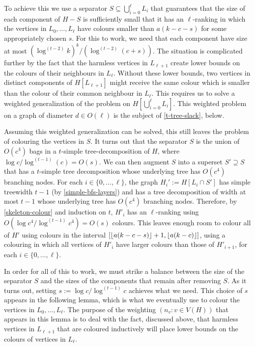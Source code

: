 \documentclass[kpfonts]{patmorin}
\theoremstyle{named}
\begin{document}
To achieve this we use a separator $S\subseteq \bigcup_{i=0}^\ell L_i$ that guarantees that the size of each component of $H-S$ is sufficiently small that it has an $\ell$-ranking in which the vertices in $L_0,\ldots,L_\ell$ have colours smaller than $a(k-c-s)$ for some appropriately chosen $s$. For this to work, we need that each component have size at most $(\log^{(t-2)} k)^k/(\log^{(t-2)}(c+s))$.  The situation is complicated further by the fact that the harmless vertices in $L_{\ell+1}$ create lower bounds on the colours of their neighbours in $L_\ell$.  Without these lower bounds, two vertices in distinct components of $H[L_{\ell+1}]$ might receive the same colour which is smaller than the colour of their common neighbour in $L_\ell$.  This requires us to solve a weighted generalization of the problem on $H[\bigcup_{i=0}^{\ell} L_i]$.  This weighted problem on a graph of diameter $d\in O(\ell)$ is the subject of \cref{t-tree-slack}, below.

Assuming this weighted generalization can be solved, this still leaves the problem of colouring the vertices in $S$.  It turns out that the separator $S$ is the union of $O(c^4)$ bags in a $t$-simple tree-decomposition of $H$, where $\log c/\log^{(t-1)}(c)=O(s)$.  We can then augment $S$ into a superset $S'\supseteq S$ that has a $t$-simple tree decomposition whose underlying tree has $O(c^4)$ branching nodes.  For each $i\in\{0,\ldots,\ell\}$, the graph $H_i':=H[L_i\cap S']$ has simple treewidth $t-1$ (by \cref{simple-bfs-layers}) and has a tree decomposition of width at most $t-1$ whose underlying tree has $O(c^4)$ branching nodes.  Therefore, by \cref{skeleton-colour} and induction on $t$, $H'_i$ has an $\ell$-ranking using $O(\log c^4/\log^{(t-1)} c^4)=O(s)$ colours. This leaves enough room to colour all of $H'$ using colours in the interval $[{\lfloor a(k-c-s) \rfloor}+1,{\lfloor a(k-c) \rfloor}]$, using a colouring in which all vertices of $H'_i$ have larger colours than those of $H'_{i+1}$, for each $i\in\{0,\ldots,\ell\}$.

In order for all of this to work, we must strike a balance between the size of the separator $S$ and the sizes of the components that remain after removing $S$.  As it turns out, setting $s:=\log c/\log^{(t-1)} c$ achieves what we need.  This choice of $s$ appears in the following lemma, which is what we eventually use to colour the vertices in $L_0,\ldots,L_\ell$.  The purpose of the weighting $(n_v:v\in V(H))$ that appears in this lemma is to deal with the fact, discussed above, that harmless vertices in $L_{\ell+1}$ that are coloured inductively will place lower bounds on the colours of vertices in $L_{\ell}$.
\end{document}
